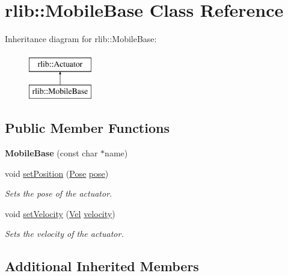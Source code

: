 \hypertarget{classrlib_1_1MobileBase}{\section{rlib\-:\-:Mobile\-Base Class Reference}
\label{classrlib_1_1MobileBase}
}
Inheritance diagram for rlib\-:\-:Mobile\-Base\-:\begin{figure}[H]
\begin{center}
\leavevmode
\includegraphics[height=2.000000cm]{classrlib_1_1MobileBase}
\end{center}
\end{figure}
\subsection*{Public Member Functions}
\begin{DoxyCompactItemize}
\item 
\hypertarget{classrlib_1_1MobileBase_a7bd9b6898b967ea5eee27f64a4a62063}{{\bfseries Mobile\-Base} (const char $\ast$name)}\label{classrlib_1_1MobileBase_a7bd9b6898b967ea5eee27f64a4a62063}

\item 
void \hyperlink{classrlib_1_1MobileBase_ab384dfccdcadfdfdcb4682b7361502f0}{set\-Position} (\hyperlink{classrlib_1_1Pose}{Pose} \hyperlink{classrlib_1_1Actuator_adcce3f106abc4127382d0d9794bb7b15}{pose})
\begin{DoxyCompactList}\small\item\em Sets the pose of the actuator. \end{DoxyCompactList}\item 
void \hyperlink{classrlib_1_1MobileBase_a0d299cb807df63bd9cf9b259d4ce84fe}{set\-Velocity} (\hyperlink{classrlib_1_1Vel}{Vel} \hyperlink{classrlib_1_1Actuator_a27372af2dd629e7b434eb541de0a13a8}{velocity})
\begin{DoxyCompactList}\small\item\em Sets the velocity of the actuator. \end{DoxyCompactList}\end{DoxyCompactItemize}
\subsection*{Additional Inherited Members}


